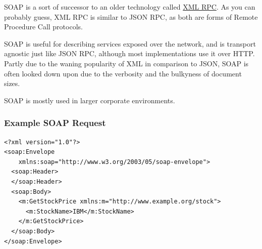 \documentclass{book}
\begin{document}
SOAP is a sort of successor to an older technology called \href{https://en.wikipedia.org/wiki/XML-RPC}{XML RPC}. As you can probably guess, XML RPC is similar to JSON RPC, as both are forms of Remote Procedure Call protocols.

SOAP is useful for describing services exposed over the network, and is transport agnostic just like JSON RPC, although most implementations use it over HTTP. Partly due to the waning popularity of XML in comparison to JSON, SOAP is often looked down upon due to the verbosity and the bulkyness of document sizes.

SOAP is mostly used in larger corporate environments.

\subsubsection{Example SOAP Request}

\begin{verbatim}
<?xml version="1.0"?>
<soap:Envelope
    xmlns:soap="http://www.w3.org/2003/05/soap-envelope">
  <soap:Header>
  </soap:Header>
  <soap:Body>
    <m:GetStockPrice xmlns:m="http://www.example.org/stock">
      <m:StockName>IBM</m:StockName>
    </m:GetStockPrice>
  </soap:Body>
</soap:Envelope>
\end{verbatim}
\end{document}
